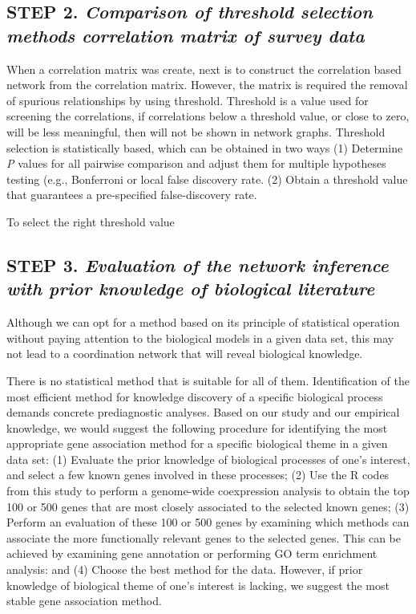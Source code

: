 \subsection*{\textbf{STEP 2. }\textit{Comparison of threshold selection methods correlation matrix of survey data}} %

When a correlation matrix was create, next is to construct the correlation based network from the correlation matrix. However, the matrix is required the removal of spurious relationships by using threshold. Threshold is a value used for screening the correlations, if correlations  below a threshold value, or close to zero, will be less meaningful, then will not be shown in network graphs. Threshold selection is statistically based, which can be obtained in two ways (1) Determine \textit{P} values for all pairwise comparison and adjust them for multiple hypotheses testing (e.g., Bonferroni or local false discovery rate. (2) Obtain a threshold value that guarantees a pre-specified false-discovery rate. 


To select the right threshold value


\subsection*{\textbf{STEP 3. }\textit{Evaluation of the network inference with  prior knowledge of biological literature}} %

 
Although we can opt for a method based on its principle of statistical operation without paying attention to the biological models in a given data set, this may not lead to a coordination network that will reveal biological knowledge. 


 


There is no statistical method that is suitable for all of them. Identification of the most efficient method for knowledge discovery of a specific biological process demands concrete prediagnostic analyses. Based on our study and our empirical knowledge, we would suggest the following procedure for identifying the most appropriate gene association method for a specific biological theme in a given data set: (1) Evaluate the prior knowledge of biological processes of one’s interest, and select a few known genes involved in these processes; (2) Use the R codes from this study to perform a genome-wide coexpression analysis to obtain the top 100 or 500 genes that are most closely associated to the selected known genes; (3) Perform an evaluation of these 100 or 500 genes by examining which methods can associate the more functionally relevant genes to the selected genes. This can be achieved by examining gene annotation or performing GO term enrichment analysis: and (4) Choose the best method for the data. However, if prior knowledge of biological theme of one’s interest is lacking, we suggest the most stable gene association method. 

